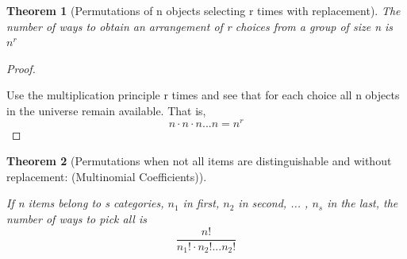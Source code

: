 \documentclass[10pt,]{book}
\theoremstyle{plain}
\newtheorem{theorem}{Theorem}[section]
\theoremstyle{definition}
\theoremstyle{definition}
\theoremstyle{definition}
\numberwithin{equation}{section}
\begin{document}
\begin{theorem}[Permutations of n objects selecting r times with replacement]\label{theorem-12}
The number of ways to obtain an arrangement of r choices from a group of size n is \(n^r\)\end{theorem}
\begin{proof}\hypertarget{proof-9}{}

			Use the multiplication principle r times and see that for each choice all n objects in the universe remain available.  That is, 
			\begin{equation*}n \cdot n \cdot n ... n = n^r\end{equation*}
\end{proof}
\begin{theorem}[Permutations when not all items are distinguishable and without replacement: (Multinomial Coefficients)]\label{theorem-13}

If n items belong to s categories, \(n_1\) in first, \(n_2\) in second, ... , \(n_s\) in the last, the number of ways to pick all is
		\begin{equation*}\frac{n!}{n_1! \cdot n_2! ... n_2!}\end{equation*}\end{theorem}
\typeout{************************************************}
\typeout{************************************************}
\end{document}
